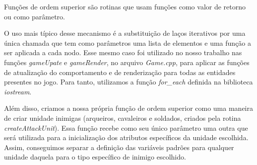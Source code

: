 \documentclass[rel_mlp]{iiufrgs}
\begin{document}
	Funções de ordem superior são rotinas que usam funções como valor de retorno ou como parâmetro.
	
		O uso mais típico desse mecanismo é a substituição de laços iterativos por uma única chamada que tem como parâmetros uma lista de elementos e uma função a ser aplicada a cada nodo. Esse mesmo caso foi utilizado no nosso trabalho nas funções \textit{gameUpate} e \textit{gameRender}, no arquivo \textit{Game.cpp}, para aplicar as funções de atualização do comportamento e de renderização para todas as entidades presentes no jogo. Para tanto, utilizamos a função \textit{for\_each}	definida na biblioteca \textit{iostream}.
	
	Além disso, criamos a nossa própria função de ordem superior como uma maneira de criar unidade inimigas (arqueiros, cavaleiros e soldados, criados pela rotina \textit{createAttackUnit}). Essa função recebe como seu único parâmetro uma outra que será utilizada para a inicialização dos atributos específicos da unidade escolhida. Assim, conseguimos separar a definição das variáveis padrões para qualquer unidade daquela para o tipo específico de inimigo escolhido.


 

%

%

\end{document}
